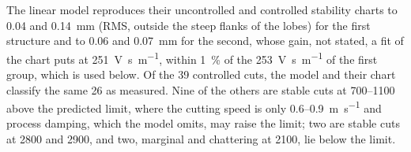 The linear model reproduces their uncontrolled and controlled stability charts to 0.04 and \SI{0.14}{\milli\metre} (RMS, outside the steep flanks of the lobes) for the first structure and to 0.06 and \SI{0.07}{\milli\metre} for the second, whose gain, not stated, a fit of the chart puts at \SI{251}{\volt\second\per\metre}, within \SI{1}{\percent} of the \SI{253}{\volt\second\per\metre} of the first group, which is used below. Of the 39 controlled cuts, the model and their chart classify the same 26 as measured. Nine of the others are stable cuts at 700--\SI{1100}{\rpm} above the predicted limit, where the cutting speed is only 0.6--\SI{0.9}{\metre\per\second} and process damping, which the model omits, may raise the limit; two are stable cuts at 2800 and \SI{2900}{\rpm}, and two, marginal and chattering at \SI{2100}{\rpm}, lie below the limit.

